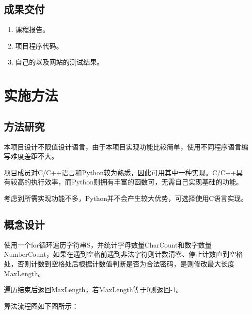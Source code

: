 \begin{spacing}{1.5}
    \subsection{成果交付}
    \begin{enumerate} [\indent 1、]
        \item 课程报告。
        \item 项目程序代码。
        \item 自己的以及网站的测试结果。
    \end{enumerate}
    \section{实施方法}
    \subsection{方法研究}
    本项目设计不限值设计语言，由于本项目实现功能比较简单，使用不同程序语言编写难度差距不大。

    项目成员对C/C++语言和Python较为熟悉，因此可用其中一种实现。C/C++具有较高的执行效率，而Python则拥有丰富的函数可，无需自己实现基础的功能。

    考虑到所需实现功能不多，Python并不会产生较大优势，可选择使用C语言实现。

    \subsection{概念设计}
    使用一个for循环遍历字符串S，并统计字母数量CharCount和数字数量NumberCount，如果在遇到空格前遇到非法字符则计数清零、停止计数直到空格处，否则计数到空格处后根据计数值判断是否为合法密码，是则修改最大长度MaxLength。

    遍历结束后返回MaxLength，若MaxLength等于0则返回-1。

    算法流程图如下图所示：
\end{spacing}
\begin{spacing}{1}
\songti{}
    
\end{spacing}
